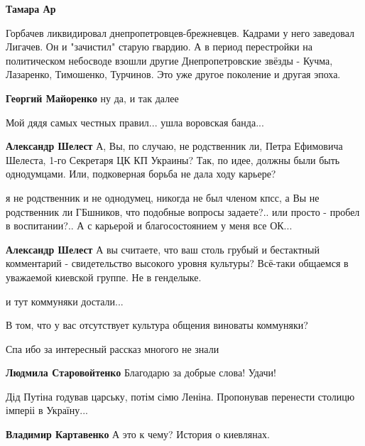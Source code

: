 \begin{itemize}
\begin{itemize} %
\textbf{Тамара Ар} 

Горбачев ликвидировал днепропетровцев-брежневцев. Кадрами у него заведовал
Лигачев. Он и "зачистил" старую гвардию. А в период перестройки на политическом
небосводе взошли другие Днепропетровские звёзды - Кучма, Лазаренко, Тимошенко,
Турчинов. Это уже другое поколение и другая эпоха.

\textbf{Георгий Майоренко} ну да, и так далее
\end{itemize} %

Мой дядя самых честных правил... ушла воровская банда...

\begin{itemize} %
\textbf{Александр Шелест} А, Вы, по случаю, не родственник ли, Петра Ефимовича Шелеста, 1-го Секретаря ЦК КП Украины? Так, по идее, должны были быть однодумцами. Или, подковерная борьба не дала ходу карьере?

я не родственник и не однодумец, никогда не был членом кпсс, а Вы не родственник ли ГБшников, что подобные вопросы задаете?.. или просто - пробел в воспитании?.. А с карьерой и благосостоянием у меня все ОК...

\textbf{Александр Шелест} А вы считаете, что ваш столь грубый и бестактный комментарий - свидетельство высокого уровня культуры? Всё-таки общаемся в уважаемой киевской группе. Не в генделыке.

и тут коммуняки достали...

В том, что у вас отсутствует культура общения виноваты коммуняки?
\end{itemize} %

Спа ибо за интересный рассказ многого не знали

\begin{itemize} %
\textbf{Людмила Старовойтенко} Благодарю за добрые слова! Удачи!
\end{itemize} %

Дід Путіна годував царську, потім сімю Леніна. Пропонував перенести столицю імперіі в Україну...

\begin{itemize} %
\textbf{Владимир Картавенко} А это к чему? История о киевлянах.


\end{itemize}
\end{itemize}
